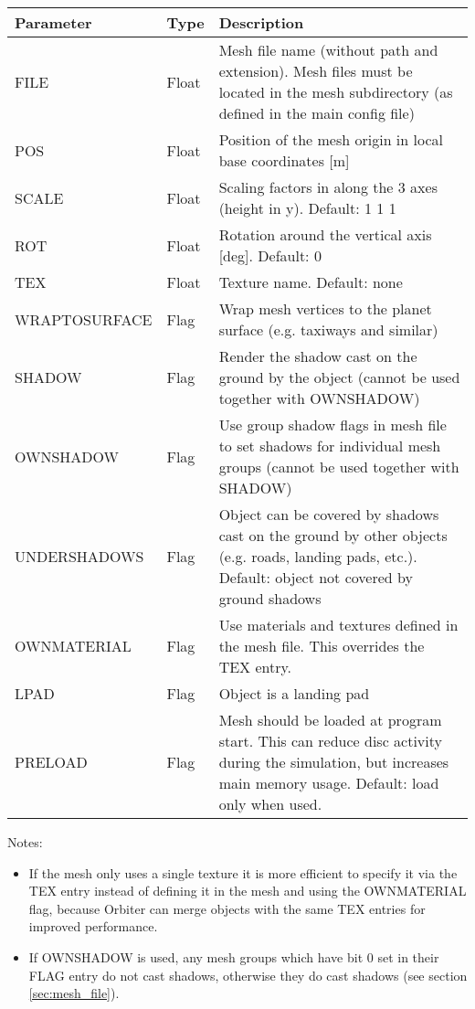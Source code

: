 \documentclass[Orbiter Developer Manual.tex]{subfiles}
\begin{document}
	\begin{longtable}{ |p{}|p{}|p{}| }
	\hline\rule{0pt}{2ex}
	\textbf{Parameter} & \textbf{Type} & \textbf{Description}\\
	\hline\rule{0pt}{2ex}
	FILE & Float & Mesh file name (without path and extension). Mesh files must be located in the mesh subdirectory (as defined in the main config file)\\
	\hline\rule{0pt}{2ex}
	POS & Float & Position of the mesh origin in local base coordinates [m]\\
	\hline\rule{0pt}{2ex}
	SCALE & Float & Scaling factors in along the 3 axes (height in y). Default: 1 1 1\\
	\hline\rule{0pt}{2ex}
	ROT & Float & Rotation around the vertical axis [deg]. Default: 0\\
	\hline\rule{0pt}{2ex}
	TEX & Float & Texture name. Default: none\\
	\hline\rule{0pt}{2ex}
	WRAPTOSURFACE & Flag & Wrap mesh vertices to the planet surface (e.g. taxiways and similar)\\
	\hline\rule{0pt}{2ex}
	SHADOW & Flag & Render the shadow cast on the ground by the object (cannot be used together with OWNSHADOW)\\
	\hline\rule{0pt}{2ex}
	OWNSHADOW & Flag & Use group shadow flags in mesh file to set shadows for individual mesh groups (cannot be used together with SHADOW)\\
	\hline\rule{0pt}{2ex}
	UNDERSHADOWS & Flag & Object can be covered by shadows cast on the ground by other objects (e.g. roads, landing pads, etc.). Default: object not covered by ground shadows\\
	\hline\rule{0pt}{2ex}
	OWNMATERIAL & Flag & Use materials and textures defined in the mesh file. This overrides the TEX entry.\\
	\hline\rule{0pt}{2ex}
	LPAD & Flag & Object is a landing pad\\
	\hline\rule{0pt}{2ex}
	PRELOAD & Flag & Mesh should be loaded at program start. This can reduce disc activity during the simulation, but increases main memory usage. Default: load only when used.\\
	\hline
	\end{longtable}

\noindent
Notes:

\begin{itemize}
\item If the mesh only uses a single texture it is more efficient to specify it via the TEX entry instead of defining it in the mesh and using the OWNMATERIAL flag, because Orbiter can merge objects with the same TEX entries for improved performance.
\item If OWNSHADOW is used, any mesh groups which have bit 0 set in their FLAG entry do not cast shadows, otherwise they do cast shadows (see section \ref{sec:mesh_file}).
\end{itemize}
\end{document}
